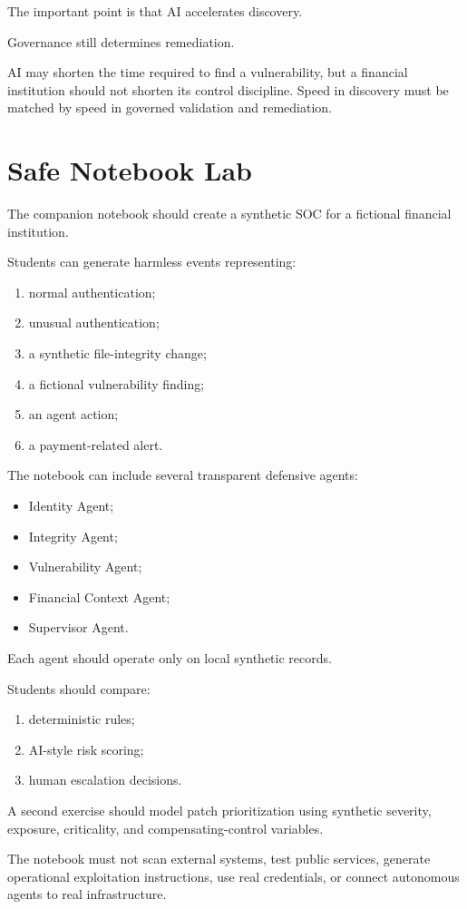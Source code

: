 The important point is that AI accelerates discovery.

Governance still determines remediation.

\begin{risklens}
AI may shorten the time required to find a vulnerability, but a financial institution should not shorten its control discipline. Speed in discovery must be matched by speed in governed validation and remediation.
\end{risklens}

\section{Safe Notebook Lab}

\begin{notebooklab}
The companion notebook should create a synthetic SOC for a fictional financial institution.

Students can generate harmless events representing:
\begin{enumerate}
    \item normal authentication;
    \item unusual authentication;
    \item a synthetic file-integrity change;
    \item a fictional vulnerability finding;
    \item an agent action;
    \item a payment-related alert.
\end{enumerate}

The notebook can include several transparent defensive agents:
\begin{itemize}
    \item Identity Agent;
    \item Integrity Agent;
    \item Vulnerability Agent;
    \item Financial Context Agent;
    \item Supervisor Agent.
\end{itemize}

Each agent should operate only on local synthetic records.

Students should compare:
\begin{enumerate}
    \item deterministic rules;
    \item AI-style risk scoring;
    \item human escalation decisions.
\end{enumerate}

A second exercise should model patch prioritization using synthetic severity, exposure, criticality, and compensating-control variables.

The notebook must not scan external systems, test public services, generate operational exploitation instructions, use real credentials, or connect autonomous agents to real infrastructure.
\end{notebooklab}

